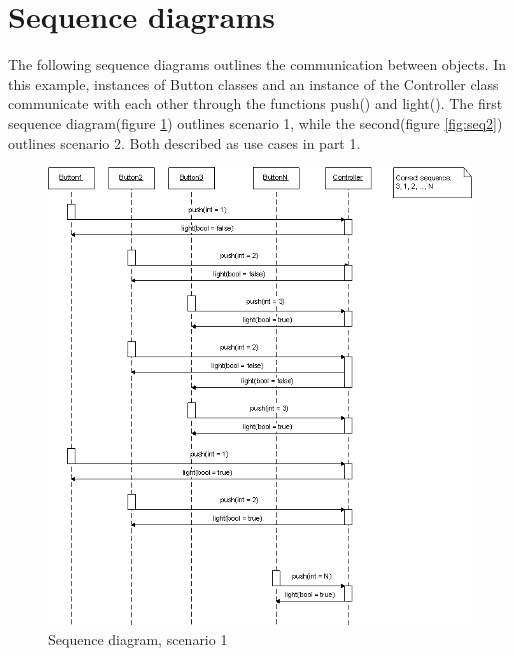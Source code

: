 \documentclass{article}
\begin{document}
\section{Sequence diagrams}
The following sequence diagrams outlines the communication between objects.
In this example, instances of Button classes and an instance of the Controller
class communicate with each other through the functions push() and light(). The
first sequence diagram(figure \ref{fig:seq1}) outlines scenario 1, 
while the second(figure \ref{fig:seq2}) outlines scenario
2. Both described as use cases in part 1.

  \begin{figure}
    \centering
  \includegraphics[width=\linewidth]{../sequence_scenario1}
    \caption{Sequence diagram, scenario 1}
    \label{fig:seq1}
  \end{figure}
\end{document}
